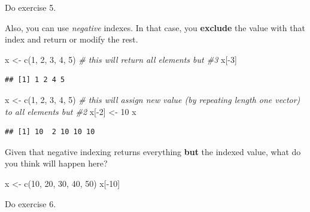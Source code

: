 \documentclass[
]{book}
\newenvironment{Shaded}{\begin{snugshade}}{\end{snugshade}}
\newcommand{\CommentTok}[1]{\textcolor[rgb]{0.56,0.35,0.01}{\textit{#1}}}
\newcommand{\DecValTok}[1]{\textcolor[rgb]{0.00,0.00,0.81}{#1}}
\newcommand{\FunctionTok}[1]{\textcolor[rgb]{0.00,0.00,0.00}{#1}}
\newcommand{\NormalTok}[1]{#1}
\newcommand{\OtherTok}[1]{\textcolor[rgb]{0.56,0.35,0.01}{#1}}
\newcommand{\SpecialCharTok}[1]{\textcolor[rgb]{0.00,0.00,0.00}{#1}}
\begin{document}
Do exercise 5.

Also, you can use \emph{negative} indexes. In that case, you \textbf{exclude} the value with that index and return or modify the rest.

\begin{Shaded}
\begin{Highlighting}[]
\NormalTok{x }\OtherTok{\textless{}{-}} \FunctionTok{c}\NormalTok{(}\DecValTok{1}\NormalTok{, }\DecValTok{2}\NormalTok{, }\DecValTok{3}\NormalTok{, }\DecValTok{4}\NormalTok{, }\DecValTok{5}\NormalTok{)}
\CommentTok{\# this will return all elements but \#3}
\NormalTok{x[}\SpecialCharTok{{-}}\DecValTok{3}\NormalTok{] }
\end{Highlighting}
\end{Shaded}

\begin{verbatim}
## [1] 1 2 4 5
\end{verbatim}

\begin{Shaded}
\begin{Highlighting}[]
\NormalTok{x }\OtherTok{\textless{}{-}} \FunctionTok{c}\NormalTok{(}\DecValTok{1}\NormalTok{, }\DecValTok{2}\NormalTok{, }\DecValTok{3}\NormalTok{, }\DecValTok{4}\NormalTok{, }\DecValTok{5}\NormalTok{)}
\CommentTok{\# this will assign new value (by repeating length one vector) to all elements but \#2}
\NormalTok{x[}\SpecialCharTok{{-}}\DecValTok{2}\NormalTok{] }\OtherTok{\textless{}{-}} \DecValTok{10}
\NormalTok{x}
\end{Highlighting}
\end{Shaded}

\begin{verbatim}
## [1] 10  2 10 10 10
\end{verbatim}

Given that negative indexing returns everything \textbf{but} the indexed value, what do you think will happen here?

\begin{Shaded}
\begin{Highlighting}[]
\NormalTok{x }\OtherTok{\textless{}{-}} \FunctionTok{c}\NormalTok{(}\DecValTok{10}\NormalTok{, }\DecValTok{20}\NormalTok{, }\DecValTok{30}\NormalTok{, }\DecValTok{40}\NormalTok{, }\DecValTok{50}\NormalTok{)}
\NormalTok{x[}\SpecialCharTok{{-}}\DecValTok{10}\NormalTok{]}
\end{Highlighting}
\end{Shaded}

Do exercise 6.
\end{document}
